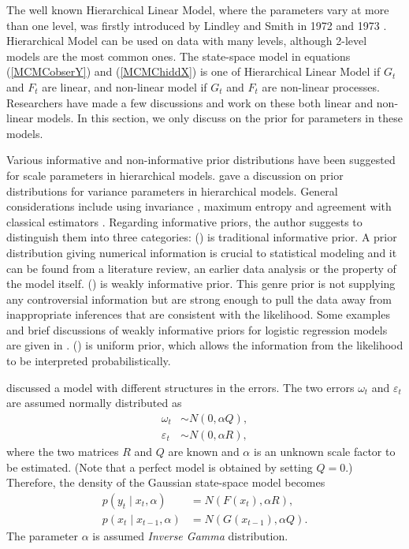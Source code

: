 The well known Hierarchical Linear Model, where the parameters vary at more than one level, was firstly introduced by Lindley and Smith in 1972 and 1973 \cite{lindley1972bayes} \cite{smith1973general}. Hierarchical Model can be used on data with many levels, although 2-level models are the most common ones. The state-space model in equations (\ref{MCMCobserY}) and (\ref{MCMChiddX}) is one of Hierarchical Linear Model if $G_t$ and $F_t$ are linear, and non-linear model if $G_t$ and $F_t$ are non-linear processes. Researchers have made a few discussions and work on these both linear and non-linear models. In this section, we only discuss on the prior for parameters in these models. 

Various informative and non-informative prior distributions have been suggested for scale parameters in hierarchical models. \cite{gelman2006prior} gave a discussion on prior distributions for variance parameters in hierarchical models. General considerations include using invariance \cite{jeffries1961theory}, maximum entropy \cite{jaynes1983papers} and agreement with classical estimators \cite{box2011bayesian}. Regarding informative priors, the author suggests to distinguish them into three categories: () is traditional informative prior. A prior distribution giving numerical information is crucial to statistical modeling and it can be found from a literature review, an earlier data analysis or the property of the model itself. () is weakly informative prior. This genre prior is not supplying any controversial information but are strong enough to pull the data away from inappropriate inferences that are consistent with the likelihood. Some examples and brief discussions of weakly informative priors for logistic regression models are given in \cite{gelman2008weakly}. () is uniform prior, which allows the information from the likelihood to be interpreted probabilistically. 

\cite{stroud2007sequential} discussed a model with different structures in the errors. The two errors $\omega_t$ and $\varepsilon_t$ are assumed normally distributed as
\begin{align*}
\omega_t &\sim N(0,\alpha Q),\\
\varepsilon_t &\sim N(0,\alpha R),
\end{align*}
where the two matrices $R$ and $Q$ are known and $\alpha$ is an unknown scale factor to be estimated. (Note that a perfect model is obtained by setting $Q= 0$.) Therefore, the density of the Gaussian state-space model becomes 
\begin{align*}
p(y_t\mid x_t,\alpha) &= N(F(x_t),\alpha R),\\
p(x_t\mid x_{t-1},\alpha) &= N(G(x_{t-1}),\alpha Q).
\end{align*}
The parameter $\alpha$ is assumed \textit{Inverse Gamma} distribution. 

